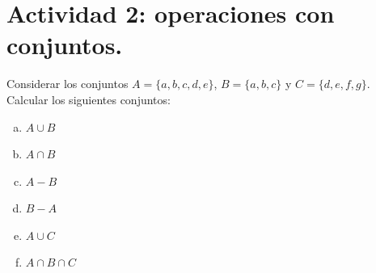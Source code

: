 \documentclass[11pt]{article}
\begin{document}
\section*{Actividad 2: operaciones con conjuntos.}

\begin{exercise}
    Considerar los conjuntos $A = \{a, b, c, d, e\}$, $B = \{a, b, c\}$ y $C = \{d, e, f, g\}$. Calcular los siguientes conjuntos:
    \begin{multicols}{6}
        \begin{enumerate}[a)]
            \item $A \cup B$
            \item $A \cap B$
            \item $A - B$
            \item $B - A$
            \item $A \cup C$
            \item $A\cap B \cap C$
        \end{enumerate}
    \end{multicols}
\end{exercise}
\end{document}
